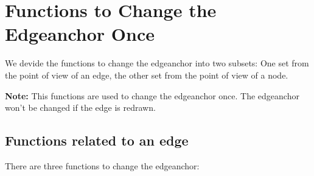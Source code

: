 \documentclass[twoside,fleqn]{report}
\begin{document}

\section{Functions to Change the Edgeanchor Once}

We devide the functions to change the edgeanchor into two subsets: 
One set from the point of view of an edge, 
the other set from the point of view of a node.

\textbf{Note:} 
This functions are used to change the edgeanchor once. 
The edgeanchor won't be changed if the edge is redrawn.
\subsection{Functions related to an edge}

There are three functions to change the edgeanchor:
\end{document}
